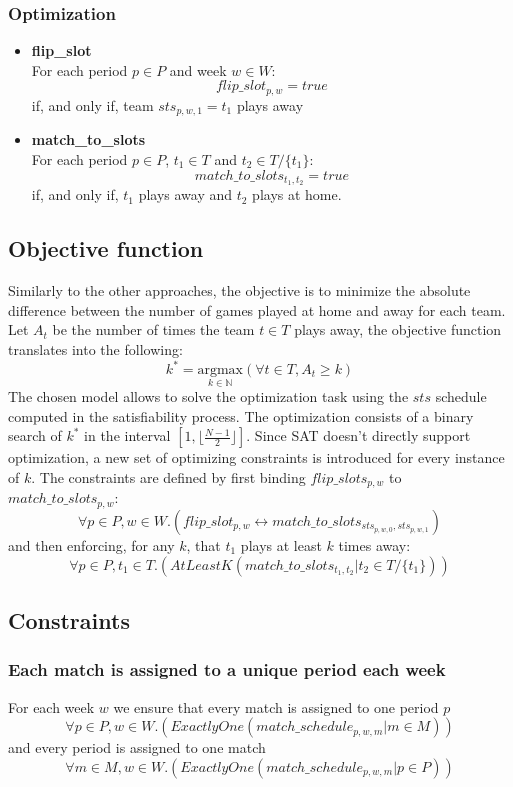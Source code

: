 \subsubsection{Optimization}
\begin{itemize}
    \item \textbf{flip\_slot}\\
        For each period $p \in P$ and week $w \in W$:
        $$
        flip\_slot_{p, w} = true
        $$
        if, and only if, team $sts_{p, w, 1} = t_1$ plays away
    \item \textbf{match\_to\_slots}\\
        For each period $p \in P$, $t_1 \in T$ and $t_2 \in T/\{t_1\}$:
        $$
        match\_to\_slots_{t_1, t_2} = true
        $$
        if, and only if, $t_1$ plays away and $t_2$ plays at home.
\end{itemize}

\subsection{Objective function}
Similarly to the other approaches, the objective is to minimize the absolute difference between the number of games played at home and away for each team.
Let $A_t$ be the number of times the team $t \in T$ plays away, the objective function translates into the following:
$$
k^* = \underset{k \in \mathbb{N}}{\text{argmax}} \left( \forall t \in T, A_t \geq k \right)
$$
The chosen model allows to solve the optimization task using the $sts$ schedule computed in the satisfiability process. The optimization consists of a binary search of $k^*$ in the interval $[1, \lfloor\frac{N-1}{2}\rfloor]$. Since SAT doesn't directly support optimization, a new set of optimizing constraints is introduced for every instance of $k$. The constraints are defined by first binding $flip\_slots_{p, w}$ to $match\_to\_slots_{p, w}$:
$$
    \forall p \in P, w \in W.(flip\_slot_{p, w} \leftrightarrow match\_to\_slots_{sts_{p, w, 0}, sts_{p, w, 1}})
$$
and then enforcing, for any $k$, that $t_1$ plays at least $k$ times away:
$$
    \forall p \in P, t_1 \in T.(AtLeastK(match\_to\_slots_{t_1, t_2} | t_2 \in T/\{t_1\}))
$$

\subsection{Constraints}
\subsubsection{Each match is assigned to a unique period each week}
For each week $w$ we ensure that every match is assigned to one period $p$
$$
    \forall p \in P, w \in W.(ExactlyOne(match\_schedule_{p, w, m} | m \in M))
$$
and every period is assigned to one match
$$
    \forall m \in M, w \in W.(ExactlyOne(match\_schedule_{p, w, m} | p \in P))
$$

